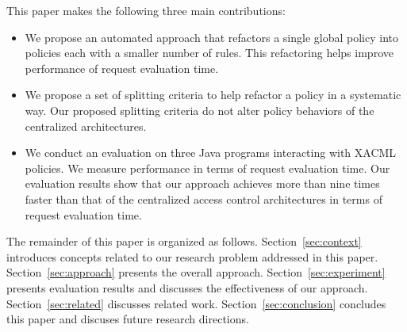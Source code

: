 
This paper makes the following three main contributions:
\begin{itemize}
\item We propose an automated approach that refactors a single global policy into policies each with a smaller number of rules. This
refactoring helps improve performance of request evaluation time.
\item We propose a set of splitting criteria to help refactor a policy in a systematic way. Our proposed splitting criteria do not alter policy behaviors of the centralized architectures.
\item We conduct an evaluation on three Java programs interacting with XACML policies. We measure performance in terms
of request evaluation time. 
Our evaluation results show that our approach achieves more than nine times faster than that of the centralized access control architectures in terms of request evaluation time.
\end{itemize}


The remainder of this paper is organized as follows. Section~\ref{sec:context} introduces concepts related to our research problem addressed in this paper.
Section~\ref{sec:approach} presents the overall approach. 
Section~\ref{sec:experiment} presents evaluation results and discusses the effectiveness of our approach. Section~\ref{sec:related} discusses related work.
Section~\ref{sec:conclusion} concludes this paper and discuses future research directions.
